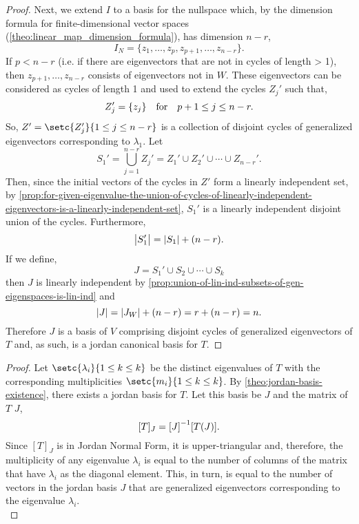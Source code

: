 \documentclass[../MathsNotesBase.tex]{subfiles}
\begin{document}
{\begin{proof}
			Next, we extend $I$ to a basis for the nullspace which, by the dimension formula for finite-dimensional vector spaces (\autoref{theo:linear_map_dimension_formula}), has dimension ${ n - r }$,
			\[ I_N = \{ z_1, \dots, z_p, z_{p+1}, \dots, z_{n-r} \}. \]
			If ${ p < n - r }$ (i.e. if there are eigenvectors that are not in cycles of length > 1), then ${ z_{p+1}, \dots, z_{n-r} }$ consists of eigenvectors not in $W$. These eigenvectors can be considered as cycles of length 1 and used to extend the cycles $Z_j'$ such that, 
			\[ Z_j' = \{z_j\} \hspace{10pt}\text{for}\hspace{10pt} p+1 \leq j \leq n-r. \]
			So, ${ Z' = \setc{Z_j'}{1 \leq j \leq n-r} }$ is a collection of disjoint cycles of generalized eigenvectors corresponding to $\lambda_1$. Let
			\[ S_1' = \bigcup_{j=1}^{n-r} Z_j' = Z_1' \cup Z_2' \cup \cdots \cup Z_{n-r}'. \]
			Then, since the initial vectors of the cycles in $Z'$ form a linearly independent set, by \autoref{prop:for-given-eigenvalue-the-union-of-cycles-of-linearly-independent-eigenvectors-is-a-linearly-independent-set}, $S_1'$ is a linearly independent disjoint union of the cycles. Furthermore,
			\[ \left\lvert S_1'\right\rvert = \left\lvert S_1\right\rvert + (n - r). \]
			If we define,
			\[ J = S_1' \cup S_2 \cup \cdots \cup S_k \]
			then $J$ is linearly independent by \autoref{prop:union-of-lin-ind-subsets-of-gen-eigenspaces-is-lin-ind} and
			\[ \left\lvert J\right\rvert = \left\lvert J_W\right\rvert + (n - r) = r + (n - r) = n. \]
			Therefore $J$ is a basis of $V$ comprising disjoint cycles of generalized eigenvectors of $T$ and, as such, is a jordan canonical basis for $T$.
		\end{proof}
	
	
		\bigskip
		\begin{proof}
			Let ${ \setc{\lambda_i}{1 \leq k \leq k} }$ be the distinct eigenvalues of $T$ with the corresponding multiplicities ${ \setc{m_i}{1 \leq k \leq k} }$. By \autoref{theo:jordan-basis-existence}, there exists a jordan basis for $T$. Let this basis be $J$ and the matrix of $T$ \wrt $J$,
			\[ [T]_J = {[J]}^{-1}[T(J)]. \]
			Since $[T]_J$ is in Jordan Normal Form, it is upper-triangular and, therefore, the multiplicity of any eigenvalue $\lambda_i$ is equal to the number of columns of the matrix that have $\lambda_i$ as the diagonal element. This, in turn, is equal to the number of vectors in the jordan basis $J$ that are generalized eigenvectors corresponding to the eigenvalue $\lambda_i$.\\
			

\end{proof}}
\end{document}
